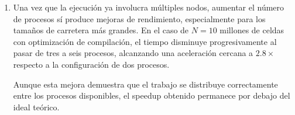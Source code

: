 \begin{enumerate}
\item

Una vez que la ejecución ya involucra múltiples nodos, aumentar el número de procesos sí produce mejoras de rendimiento, especialmente para los tamaños de carretera más grandes. En el caso de $N=10$ millones de celdas con optimización de compilación, el tiempo disminuye progresivamente al pasar de tres a seis procesos, alcanzando una aceleración cercana a $2.8\times$ respecto a la configuración de dos procesos.

Aunque esta mejora demuestra que el trabajo se distribuye correctamente entre los procesos disponibles, el speedup obtenido permanece por debajo del ideal teórico.

\end{enumerate}